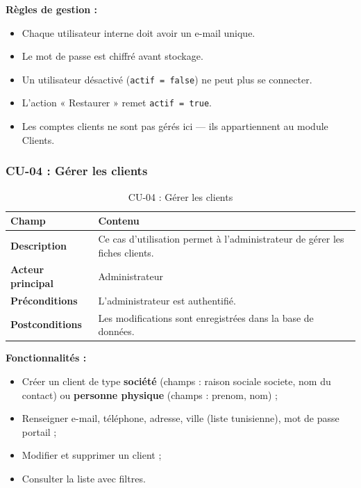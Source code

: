 \textbf{Règles de gestion :}
\begin{itemize}
    \item Chaque utilisateur interne doit avoir un e-mail unique.
    \item Le mot de passe est chiffré avant stockage.
    \item Un utilisateur désactivé (\texttt{actif = false}) ne peut plus se connecter.
    \item L'action « Restaurer » remet \texttt{actif = true}.
    \item Les comptes clients ne sont pas gérés ici --- ils appartiennent au module Clients.
\end{itemize}

\subsubsection{CU-04 : Gérer les clients}

\begin{table}[H]
\centering
\caption{CU-04 : Gérer les clients}
\label{tab:ch3:cu04}
\begin{tabular}{|p{3.5cm}|p{11cm}|}
\hline
\textbf{Champ} & \textbf{Contenu} \\
\hline
\textbf{Description}
  & Ce cas d'utilisation permet à l'administrateur de gérer les fiches clients. \\
\hline
\textbf{Acteur principal}
  & Administrateur \\
\hline
\textbf{Préconditions}
  & L'administrateur est authentifié. \\
\hline
\textbf{Postconditions}
  & Les modifications sont enregistrées dans la base de données. \\
\hline
\end{tabular}
\end{table}

\textbf{Fonctionnalités :}
\begin{itemize}
    \item Créer un client de type \textbf{société} (champs : raison sociale societe, nom du contact)
          ou \textbf{personne physique} (champs : prenom, nom) ;
    \item Renseigner e-mail, téléphone, adresse, ville (liste tunisienne), mot de passe portail ;
    \item Modifier et supprimer un client ;
    \item Consulter la liste avec filtres.
\end{itemize}

